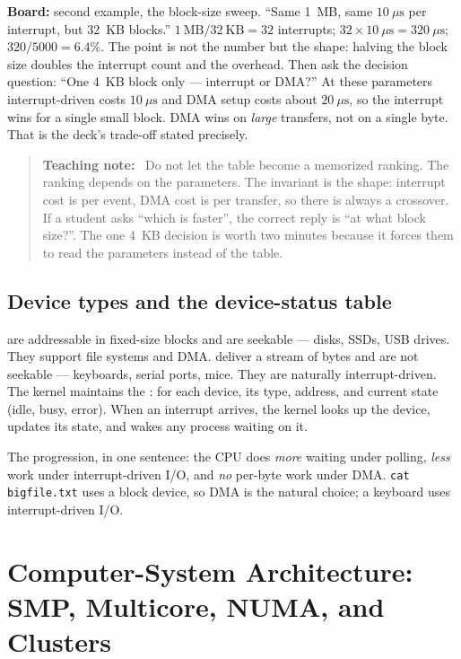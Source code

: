 \documentclass[11pt]{article}
\newenvironment{teachingaside}{\begin{quote}\small\color{primary-gold}\textbf{Teaching note:}\ }{\end{quote}}
\begin{document}
\textbf{Board:} second example, the block-size sweep. ``Same 1~MB, same
$10\ \mu\text{s}$ per interrupt, but 32~KB blocks.'' $1\ \text{MB}/32\ \text{KB} =
32$ interrupts; $32 \times 10\ \mu\text{s} = 320\ \mu\text{s}$; $320/5000 =
6.4\%$. The point is not the number but the shape: halving the block size doubles
the interrupt count and the overhead. Then ask the decision question: ``One 4~KB
block only --- interrupt or DMA?'' At these parameters interrupt-driven costs
$10\ \mu\text{s}$ and DMA setup costs about $20\ \mu\text{s}$, so the interrupt
wins for a single small block. DMA wins on \emph{large} transfers, not on a
single byte. That is the deck's trade-off stated precisely.

\begin{teachingaside}
Do not let the table become a memorized ranking. The ranking depends on the
parameters. The invariant is the shape: interrupt cost is per event, DMA cost is
per transfer, so there is always a crossover. If a student asks ``which is
faster'', the correct reply is ``at what block size?''. The one 4~KB decision is
worth two minutes because it forces them to read the parameters instead of the
table.
\end{teachingaside}

\subsection*{Device types and the device-status table}

 are addressable in fixed-size blocks and are seekable ---
disks, SSDs, USB drives. They support file systems and DMA.  deliver a stream of bytes and are not seekable --- keyboards, serial
ports, mice. They are naturally interrupt-driven. The kernel maintains the
: for each device, its type, address, and current state
(idle, busy, error). When an interrupt arrives, the kernel looks up the device,
updates its state, and wakes any process waiting on it.

The progression, in one sentence: the CPU does \emph{more} waiting under polling,
\emph{less} work under interrupt-driven I/O, and \emph{no} per-byte work under
DMA. \texttt{cat bigfile.txt} uses a block device, so DMA is the natural choice;
a keyboard uses interrupt-driven I/O.

\section{Computer-System Architecture: SMP, Multicore, NUMA, and Clusters}
\end{document}
